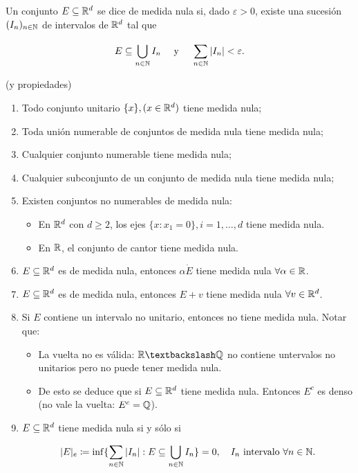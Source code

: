 \documentclass[a4paper]{report}
\begin{document}
	\begin{definition}
		Un conjunto $E\subseteq\mathbb{R}^d$ se dice de medida nula si, dado $\varepsilon>0$, existe una sucesión $(I_n)_{n\in\mathbb{N}}$ de intervalos de $\mathbb{R}^d$ tal que

		\[
		E\subseteq\bigcup_{n\in\mathbb{N}} I_n\quad\text{ y }\quad \sum_{n\in\mathbb{N}}^{}|I_n|<\varepsilon.
		\]
	\end{definition}

	\begin{eg}
		(y propiedades)
		\begin{enumerate}
			\item Todo conjunto unitario $\{x\}, (x\in\mathbb{R}^d)$ tiene medida nula;

			\item Toda unión numerable de conjuntos de medida nula tiene medida nula;

			\item Cualquier conjunto numerable tiene medida nula;
			
			\item Cualquier subconjunto de un conjunto de medida nula tiene medida nula;

			\item Existen conjuntos no numerables de medida nula:

			\begin{itemize}
				\item En $\mathbb{R}^d$ con $d\geq 2$, los ejes $\{x:x_1=0\}, i=1,\dots,d$ tiene medida nula.

				\item En $\mathbb{R}$, el conjunto de cantor tiene medida nula.
			\end{itemize}

			\item $E\subseteq\mathbb{R}^d$ es de medida nula, entonces $\alpha\dot E$ tiene medida nula $\forall\alpha\in\mathbb{R}$.
			
			\item $E\subseteq\mathbb{R}^d$ es de medida nula, entonces $E + v$ tiene medida nula $\forall v\in\mathbb{R}^d$.

			\item Si $E$ contiene un intervalo no unitario, entonces no tiene medida nula. Notar que:

			\begin{itemize}
				\item La vuelta no es válida: $\R\textbackslash\Q$ no contiene untervalos no unitarios pero no puede tener medida nula.

				\item De esto se deduce que si $E\subseteq\mathbb{R}^d$ tiene medida nula. Entonces $E^c$ es denso (no vale la vuelta: $E^c=\mathbb{Q}$).
			\end{itemize}

			\item $E\subseteq\mathbb{R}^d$ tiene medida nula si y sólo si

			\[
			|E|_e\coloneq\inf \{ \sum_{n\in\mathbb{N}} |I_n| : E \subseteq \bigcup_{n\in\mathbb{N}} I_n \} = 0, \quad I_n \text{ intervalo } \forall n \in \mathbb{N}.
			\]
		\end{enumerate}
	\end{eg}
\end{document}
